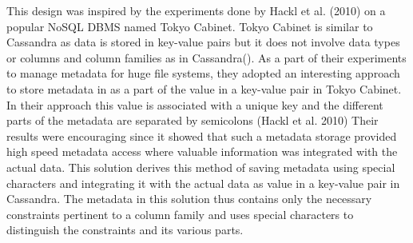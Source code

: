 
This design was inspired by the experiments done by Hackl et al.   (2010) on a
popular \ac{NoSQL} \ac{DBMS} named Tokyo Cabinet.  Tokyo Cabinet is similar to
Cassandra as data is stored in key-value pairs but it does not involve data
types or columns and column families as in Cassandra(). 
As a part of their experiments to manage metadata for huge file systems,  they
adopted an interesting approach to store metadata in as a part of the value in a
key-value pair in Tokyo Cabinet.  In their approach this value  is associated
with a unique key and the different parts of the metadata are separated by
semicolons (Hackl et al.   2010)
Their results were encouraging since it showed that such a metadata
storage provided high speed metadata access where valuable information was 
integrated with the actual data.  This solution derives this method of saving
metadata using special characters and integrating it with the actual data as
value in a key-value pair in Cassandra.  The metadata in this solution thus
contains only the necessary constraints pertinent to a column family and uses
special characters to distinguish the constraints and its various parts. 













